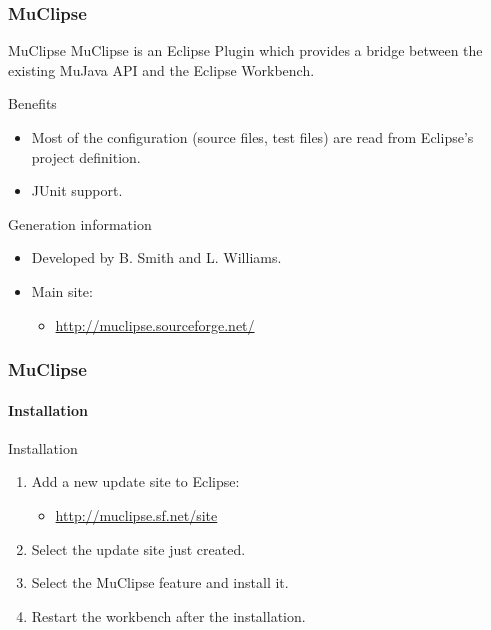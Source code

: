\begin{frame}[parent={concept:mujava}, hasprev=false, hasnext=true]
\frametitle{MuClipse}

\begin{block:concept}{MuClipse}
MuClipse is an Eclipse Plugin which provides a bridge between the existing
MuJava API and the Eclipse Workbench.
\end{block:concept}

\begin{block:fact}{Benefits}
\begin{itemize}
	\item Most of the configuration (source files, test files) are read from
	Eclipse's project definition.

	\item JUnit support.
\end{itemize}
\end{block:fact}

\begin{block:fact}{Generation information}
\begin{itemize}
	\item Developed by B. Smith and L. Williams.

	\item Main site:
	\begin{itemize}
		\item \url{http://muclipse.sourceforge.net/}
	\end{itemize}
\end{itemize}
\end{block:fact}
\end{frame}


\begin{frame}[hasprev=true, hasnext=true]
\frametitle{MuClipse}
\framesubtitle{Installation}

\begin{block:procedure}{Installation}
\begin{enumerate}
	\item Add a new update site to Eclipse:
	\begin{itemize}
		\item \url{http://muclipse.sf.net/site}
	\end{itemize}

	\item Select the update site just created.

	\item Select the MuClipse feature and install it.

	\item Restart the workbench after the installation.
\end{enumerate}
\end{block:procedure}
\end{frame}


